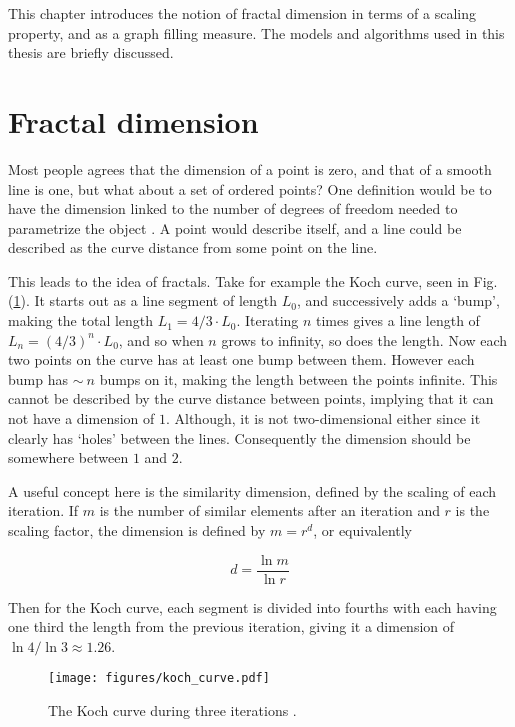 This chapter introduces the notion of fractal dimension in terms of a scaling property, and as a graph filling measure. The models and algorithms used in this thesis are briefly discussed.

\section{Fractal dimension}

Most people agrees that the dimension of a point is zero, and that of a smooth line is one, but what about a set of ordered points? One definition would be to have the dimension linked to the number of degrees of freedom needed to parametrize the object \cite{strogatz:dynamics_chaos}. A point would describe itself, and a line could be described as the curve distance from some point on the line.

This leads to the idea of fractals. Take for example the Koch curve, seen in Fig. (\ref{fig:koch_curve}). It starts out as a line segment of length $L_0$, and successively adds a `bump', making the total length $L_1 = 4/3 \cdot L_0$. Iterating $n$ times gives a line length of $L_n = {(4 / 3)}^n \cdot L_0$, and so when $n$ grows to infinity, so does the length. Now each two points on the curve has at least one bump between them. However each bump has $\sim\ n$ bumps on it, making the length between the points infinite. This cannot be described by the curve distance between points, implying that it can not have a dimension of $1$. Although, it is not two-dimensional either since it clearly has `holes' between the lines. Consequently the dimension should be somewhere between $1$ and $2$.

A useful concept here is the similarity dimension, defined by the scaling of each iteration. If $m$ is the number of similar elements after an iteration and $r$ is the scaling factor, the dimension is defined by $m = r^d$, or equivalently

\begin{equation}
	d = \frac{\ln m}{\ln r}
\label{eq:similarityDimension}
\end{equation}

Then for the Koch curve, each segment is divided into fourths with each having one third the length from the previous iteration, giving it a dimension of $\ln 4 / \ln 3 \approx 1.26$.

\begin{figure}[h!]
    \centering
        \texttt{[image: figures/koch\_curve.pdf]}
    \caption{The Koch curve during three iterations \cite{strogatz:dynamics_chaos}.}
    \label{fig:koch_curve}
\end{figure}

